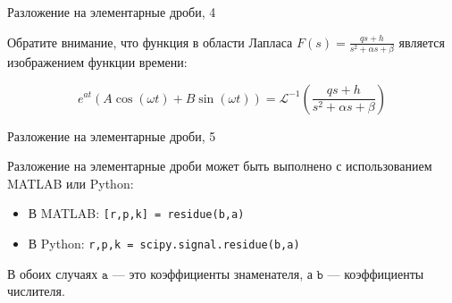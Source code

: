 \documentclass{beamer}
\begin{document}
\begin{frame}{Разложение на элементарные дроби, 4}
	\begin{flushleft}
		
		Обратите внимание, что функция в области Лапласа $F(s) = \frac{q s+ h}{s^2 + \alpha s + \beta}$ является изображением функции времени:
		
		\begin{equation*}
			e^{at}(A \cos(\omega t) + B \sin(\omega t)) 
			= \mathcal{L}^{-1}\left( \frac{q s+ h}{s^2 + \alpha s + \beta}\right)
		\end{equation*}		
		
		
	\end{flushleft}
\end{frame}




\begin{frame}{Разложение на элементарные дроби, 5}
	\begin{flushleft}
		
		Разложение на элементарные дроби может быть выполнено с использованием MATLAB или Python:
		
		\bigskip
		
		\begin{itemize}
			\item В MATLAB: \texttt{[r,p,k] = residue(b,a)}
			
			\item В Python: \texttt{r,p,k = scipy.signal.residue(b,a)}
		\end{itemize}
		
		\bigskip
		
		В обоих случаях $\texttt{a}$ — это коэффициенты знаменателя, а $\texttt{b}$ — коэффициенты числителя. 
		
	\end{flushleft}
\end{frame}
\end{document}
